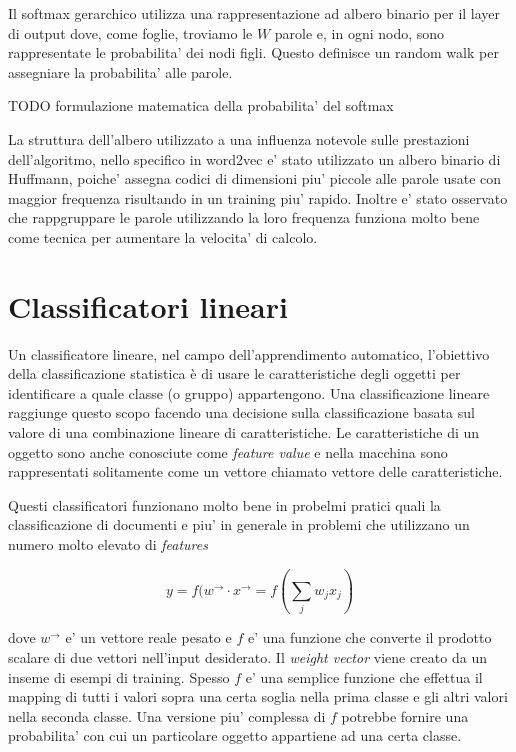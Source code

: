 \documentclass[a4paper,11pt]{book}
\theoremstyle{definition}
\begin{document}
Il softmax gerarchico utilizza una rappresentazione ad albero binario per il layer di output dove, come foglie,
troviamo le $W$ parole e, in ogni nodo, sono rappresentate le probabilita' dei nodi figli.
Questo definisce un random walk per assegniare la probabilita' alle parole.

TODO formulazione matematica della probabilita' del softmax

La struttura dell'albero utilizzato a una influenza notevole sulle prestazioni dell'algoritmo, nello specifico
in word2vec e' stato utilizzato un albero binario di Huffmann, poiche' assegna codici di dimensioni piu' piccole
alle parole usate con maggior frequenza risultando in un training piu' rapido.
Inoltre e' stato osservato che rappgruppare le parole utilizzando la loro frequenza funziona molto
bene come tecnica per aumentare la velocita' di calcolo.

\section{Classificatori lineari}
Un classificatore lineare, nel campo dell'apprendimento automatico, l'obiettivo della 
classificazione statistica è di usare le caratteristiche degli oggetti per identificare
a quale classe (o gruppo) appartengono. 
Una classificazione lineare raggiunge questo scopo facendo una decisione sulla classificazione basata sul valore di una combinazione lineare di caratteristiche. Le caratteristiche di un oggetto sono anche conosciute come \emph{feature value} e nella macchina sono rappresentati solitamente come un vettore chiamato vettore delle caratteristiche.

Questi classificatori funzionano molto bene in probelmi pratici quali la classificazione di 
documenti e piu' in generale in problemi che utilizzano un numero molto elevato di \emph{features}

\begin{equation}
	y=f(w^\rightarrow \cdot x^\rightarrow = f (\sum_j w_jx_j)
	\label{output score}
\end{equation}

dove $w^\rightarrow$ e' un vettore reale pesato e $f$ e' una funzione che converte il prodotto scalare di due
vettori nell'input desiderato.
Il \emph{weight vector} viene creato da un inseme di esempi di training. Spesso $f$ e' una semplice funzione
che effettua il mapping di tutti i valori sopra una certa soglia nella prima classe e gli altri valori nella
seconda classe. Una versione piu' complessa di $f$ potrebbe fornire una probabilita' con cui un particolare
oggetto appartiene ad una certa classe.
\end{document}
